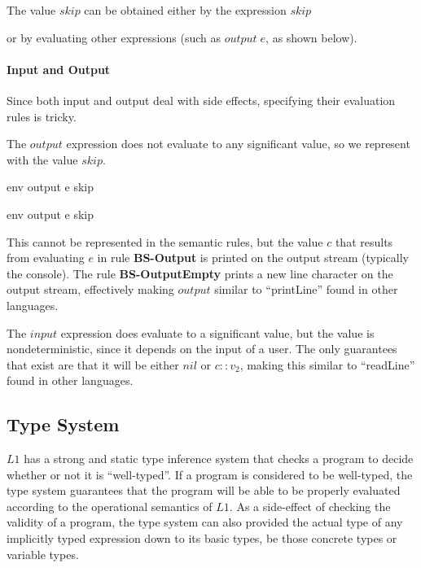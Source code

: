 \documentclass{article}
\begin{document}
The value $skip$ can be obtained either by the expression $skip$

	
or by evaluating other expressions (such as $output \; e$, as shown below).

\paragraph{Input and Output}
Since both input and output deal with side effects, specifying their evaluation rules is tricky.

The $output$ expression does not evaluate to any significant value, so we represent with the value $skip$.

	{\mbox{env} \vdash output \; e \Downarrow skip}
	
	{\mbox{env} \vdash output \; e \Downarrow skip}

This cannot be represented in the semantic rules, but the value $c$ that results from evaluating $e$ in rule \textbf{BS-Output} is printed on the output stream (typically the console).
The rule \textbf{BS-OutputEmpty} prints a new line character on the output stream, effectively making $output$ similar to "`printLine"' found in other languages.

The $input$ expression does evaluate to a significant value, but the value is nondeterministic, since it depends on the input of a user.
The only guarantees that exist are that it will be either $nil$ or $c :: v_2$, making this similar to "`readLine"' found in other languages.


\subsection{Type System}\label{Type System}
	
$L1$ has a strong and static type inference system that checks a program to decide whether or not it is "`well-typed"'.
If a program is considered to be well-typed, the type system guarantees that the program will be able to be properly evaluated according to the operational semantics of $L1$. 
As a side-effect of checking the validity of a program, the type system can also provided the actual type of any implicitly typed expression down to its basic types, be those concrete types or variable types.
\end{document}
